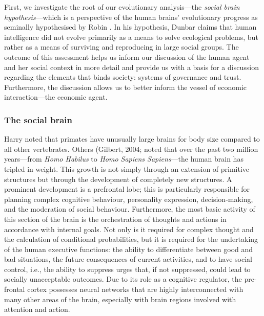 First, we investigate the root of our evolutionary analysis---the \emph{social brain hypothesis}---which is a perspective of the human brains' evolutionary progress as seminally hypothesised by Robin \citet{Dunbar1998}. In his hypothesis, Dunbar claims that human intelligence did not evolve primarily as a means to solve ecological problems, but rather as a means of surviving and reproducing in large social groups. The outcome of this assessment helps us inform our discussion of the human agent and her social context in more detail and provide us with a basis for a discussion regarding the elements that binds society: systems of governance and trust. Furthermore, the discussion allows us to better inform the vessel of economic interaction---the economic agent.

\subsubsection{The social brain}

Harry \citet{Jerison1973} noted that primates have unusually large brains for body size compared to all other vertebrates. Others (Gilbert, 2004; \citep{Schoenemann2006} noted that over the past two million years---from \emph{Homo Habilus} to \emph{Homo Sapiens Sapiens}---the human brain has tripled in weight. This growth is not simply through an extension of primitive structures but through the development of completely new structures. A prominent development is a prefrontal lobe; this is particularly responsible for planning complex cognitive behaviour, personality expression, decision-making, and the moderation of social behaviour. Furthermore, the most basic activity of this section of the brain is the orchestration of thoughts and actions in accordance with internal goals. Not only is it required for complex thought and the calculation of conditional probabilities, but it is required for the undertaking of the human executive functions: the ability to differentiate between good and bad situations, the future consequences of current activities, and to have social control, i.e., the ability to suppress urges that, if not suppressed, could lead to socially unacceptable outcomes. Due to its role as a cognitive regulator, the pre-frontal cortex possesses neural networks that are highly interconnected with many other areas of the brain, especially with brain regions involved with attention and action.

